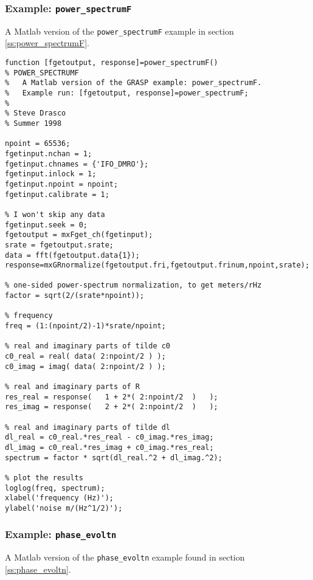 \subsubsection{Example: {\tt power\_spectrumF}}
\label{sss:power_spectrumF}

A Matlab version of the \texttt{power\_spectrumF} example in section \ref{ss:power_spectrumF}.

\begin{verbatim}
function [fgetoutput, response]=power_spectrumF()
% POWER_SPECTRUMF
%	A Matlab version of the GRASP example: power_spectrumF.
%	Example run: [fgetoutput, response]=power_spectrumF;
%
% Steve Drasco
% Summer 1998

npoint = 65536;
fgetinput.nchan = 1;
fgetinput.chnames = {'IFO_DMRO'};
fgetinput.inlock = 1;
fgetinput.npoint = npoint;
fgetinput.calibrate = 1;

% I won't skip any data
fgetinput.seek = 0;
fgetoutput = mxFget_ch(fgetinput);
srate = fgetoutput.srate;
data = fft(fgetoutput.data{1});
response=mxGRnormalize(fgetoutput.fri,fgetoutput.frinum,npoint,srate);

% one-sided power-spectrum normalization, to get meters/rHz
factor = sqrt(2/(srate*npoint));

% frequency
freq = (1:(npoint/2)-1)*srate/npoint;

% real and imaginary parts of tilde c0
c0_real = real( data( 2:npoint/2 ) );
c0_imag = imag( data( 2:npoint/2 ) );

% real and imaginary parts of R
res_real = response(   1 + 2*( 2:npoint/2  )   );
res_imag = response(   2 + 2*( 2:npoint/2  )   );

% real and imaginary parts of tilde dl
dl_real = c0_real.*res_real - c0_imag.*res_imag;
dl_imag = c0_real.*res_imag + c0_imag.*res_real;
spectrum = factor * sqrt(dl_real.^2 + dl_imag.^2);

% plot the results
loglog(freq, spectrum);
xlabel('frequency (Hz)');
ylabel('noise m/(Hz^1/2)'); 
\end{verbatim}

\subsubsection{Example: {\tt phase\_evoltn}}
\label{sss:phase_evoltn}

A Matlab version of the \texttt{phase\_evoltn} example found in section \ref{ss:phase_evoltn}.

